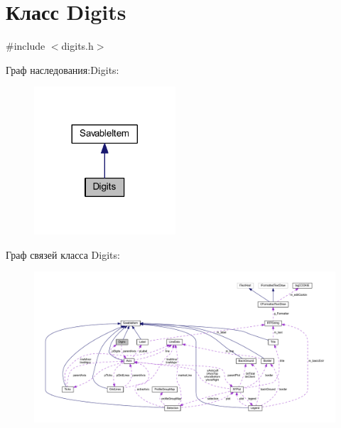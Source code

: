 \hypertarget{class_digits}{\section{Класс Digits}
\label{class_digits}
}


{\ttfamily \#include $<$digits.\-h$>$}



Граф наследования\-:Digits\-:
\nopagebreak
\begin{figure}[H]
\begin{center}
\leavevmode
\includegraphics[width=149pt]{class_digits__inherit__graph}
\end{center}
\end{figure}


Граф связей класса Digits\-:
\nopagebreak
\begin{figure}[H]
\begin{center}
\leavevmode
\includegraphics[width=350pt]{class_digits__coll__graph}
\end{center}
\end{figure}
